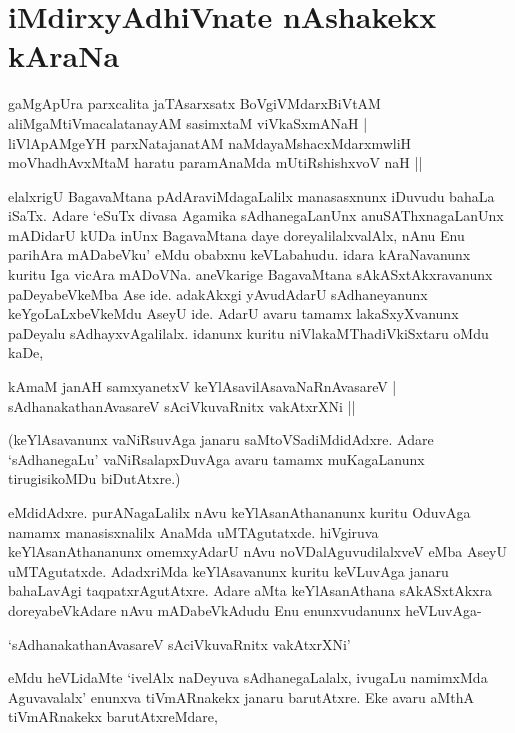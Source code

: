 \chapter{iMdirxyAdhiVnate nAshakekx kAraNa}\label{chap10}

\begin{shloka}
gaMgApUra parxcalita jaTAsarxsatx BoVgiVMdarxBiVtAM\\
aliMgaMtiVmacalatanayAM sasimxtaM viVkaSxmANaH |\\
liVlApAMgeYH parxNatajanatAM naMdayaMshacxMdarxmwliH\\
moVhadhAvxMtaM haratu paramAnaMda mUtiRshishxvoV naH ||
\end{shloka}
elalxrigU BagavaMtana pAdAraviMdagaLalilx manasasxnunx iDuvudu bahaLa iSaTx. Adare `eSuTx divasa Agamika sAdhanegaLanUnx anuSAThxnagaLanUnx mADidarU kUDa inUnx BagavaMtana daye doreyalilalxvalAlx, nAnu Enu parihAra mADabeVku' eMdu obabxnu keVLabahudu. idara kAraNavanunx kuritu Iga vicAra mADoVNa. aneVkarige BagavaMtana sAkASxtAkxravanunx paDeyabeVkeMba Ase ide. adakAkxgi yAvudAdarU sAdhaneyanunx keYgoLaLxbeVkeMdu AseyU ide. AdarU avaru tamamx lakaSxyXvanunx paDeyalu sAdhayxvAgalilalx. idanunx kuritu niVlakaMThadiVkiSxtaru oMdu kaDe,

\begin{shloka}
kAmaM janAH samxyanetxV keYlAsavilAsavaNaRnAvasareV |\\
sAdhanakathanAvasareV sAciVkuvaRnitx vakAtxrXNi ||
\end{shloka}

(keYlAsavanunx vaNiRsuvAga janaru saMtoVSadiMdidAdxre. Adare `sAdhanegaLu' vaNiRsalapxDuvAga avaru tamamx muKagaLanunx tirugisikoMDu biDutAtxre.)

eMdidAdxre. purANagaLalilx nAvu keYlAsanAthananunx kuritu OduvAga namamx manasisxnalilx AnaMda uMTAgutatxde. hiVgiruva keYlAsanAthananunx omemxyAdarU nAvu noVDalAguvudilalxveV eMba AseyU uMTAgutatxde. AdadxriMda keYlAsavanunx kuritu keVLuvAga janaru bahaLavAgi taqpatxrAgutAtxre. Adare aMta keYlAsanAthana sAkASxtAkxra doreyabeVkAdare nAvu mADabeVkAdudu Enu enunxvudanunx heVLuvAga-

\begin{shloka}
`sAdhanakathanAvasareV sAciVkuvaRnitx vakAtxrXNi'
\end{shloka}

\noindent eMdu heVLidaMte `ivelAlx naDeyuva sAdhanegaLalalx, ivugaLu namimxMda Aguvavalalx' enunxva tiVmARnakekx janaru barutAtxre. Eke avaru aMthA tiVmARnakekx barutAtxreMdare,

